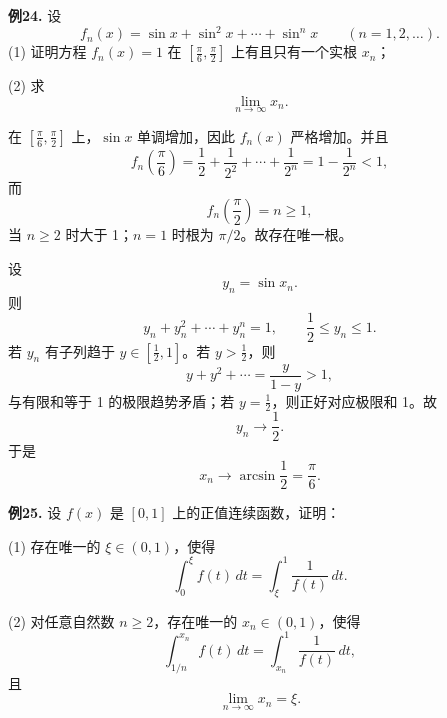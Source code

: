 \begin{problemblock}
\textbf{例24.} 设
\[
f_n(x)=\sin x+\sin^2x+\cdots+\sin^n x\qquad(n=1,2,\dots).
\]
(1) 证明方程 \(f_n(x)=1\) 在 \(\left[\frac\pi6,\frac\pi2\right]\) 上有且只有一个实根 \(x_n\)；

(2) 求
\[
\lim_{n\to\infty}x_n.
\]
\end{problemblock}

\begin{solutionblock}

在 \(\left[\frac\pi6,\frac\pi2\right]\) 上，\(\sin x\) 单调增加，因此 \(f_n(x)\) 严格增加。并且
\[
f_n\left(\frac\pi6\right)
=\frac12+\frac1{2^2}+\cdots+\frac1{2^n}
=1-\frac1{2^n}<1,
\]
而
\[
f_n\left(\frac\pi2\right)=n\ge1,
\]
当 \(n\ge2\) 时大于 1；\(n=1\) 时根为 \(\pi/2\)。故存在唯一根。

设
\[
y_n=\sin x_n.
\]
则
\[
y_n+y_n^2+\cdots+y_n^n=1,\qquad \frac12\le y_n\le1.
\]
若 \(y_n\) 有子列趋于 \(y\in[\frac12,1]\)。若 \(y>\frac12\)，则
\[
y+y^2+\cdots
=\frac{y}{1-y}>1,
\]
与有限和等于 1 的极限趋势矛盾；若 \(y=\frac12\)，则正好对应极限和 1。故
\[
y_n\to\frac12.
\]
于是
\[
x_n\to\arcsin\frac12=\frac\pi6.
\]

\end{solutionblock}

\begin{problemblock}
\textbf{例25.} 设 \(f(x)\) 是 \([0,1]\) 上的正值连续函数，证明：

(1) 存在唯一的 \(\xi\in(0,1)\)，使得
\[
\int_0^\xi f(t)\,dt=\int_\xi^1\frac1{f(t)}\,dt.
\]

(2) 对任意自然数 \(n\ge2\)，存在唯一的 \(x_n\in(0,1)\)，使得
\[
\int_{1/n}^{x_n} f(t)\,dt=\int_{x_n}^1\frac1{f(t)}\,dt,
\]
且
\[
\lim_{n\to\infty}x_n=\xi.
\]
\end{problemblock}

